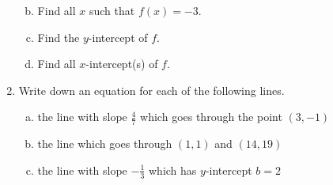 \documentclass[11pt,fleqn,dvipsnames,usenames]{article}
\begin{document}
\begin{enumerate}
\begin{multicols}{2}
\begin{enumerate}[(a)]
\vspace{1.5cm}

\item Find all $x$ such that $f(x)=-3$.

\vspace{1.5cm}

\item Find the $y$-intercept of $f$.

\vspace{1.5cm}

\item Find all $x$-intercept(s) of $f$.

\vspace{1.5cm}
\end{enumerate}
\end{multicols}

\item Write down an equation for each of the following lines.
\begin{enumerate}[(a)]
\item the line with slope $\frac{4}{7}$ which goes through the point $(3,-1)$
\item the line which goes through $(1,1)$ and $(14,19)$
\item the line with slope $-\frac{1}{3}$ which has $y$-intercept $b = 2$
\end{enumerate}
\end{enumerate}
\end{document}
